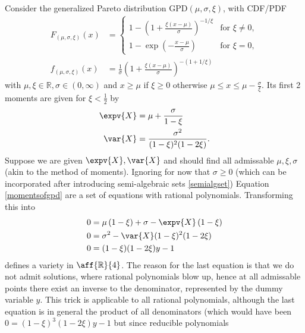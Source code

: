\begin{example}
    Consider the generalized Pareto distribution \( \text{GPD}(\mu, \sigma, \xi) \), with CDF/PDF
    \begin{align*}
        F_{(\mu,\sigma,\xi)}(x) &= \begin{cases}
1 - \left(1+ \frac{\xi(x-\mu)}{\sigma}\right)^{-1/\xi} & \text{for }\xi \neq 0, \\
1 - \exp \left(-\frac{x-\mu}{\sigma}\right) & \text{for }\xi = 0,
\end{cases} \\
            f_{(\mu,\sigma,\xi)}(x) &= \frac{1}{\sigma}\left(1 + \frac{\xi (x-\mu)}{\sigma}\right)^{- \left(1 + 1/\xi\right)}
    \end{align*}
    \[
    \]
    with \( \mu, \xi \in \mathbb{R}, \sigma \in (0, \infty) \) and \( x \geq \mu \) if \( \xi \geq 0 \) otherwise \( \mu \leq x \leq \mu - \frac{\sigma}{\xi} \). 
    Its first 2 moments are given for \( \xi < \frac{1}{2} \) by
    \begin{align} \label{momentsofgpd}
        \expv{X} &= \mu + \frac{\sigma}{1 - \xi} \\
        \var{X} &= \frac{\sigma^2}{(1 - \xi)^2 (1 - 2\xi)}.
    \end{align}
    \newline
    Suppose we are given \( \expv{X}, \var{X} \) and should find all admissable \( \mu, \xi, \sigma \) (akin to the method of moments). Ignoring for now
    that \( \sigma \geq 0 \) (which can be incorporated after introducing semi-algebraic sets \ref{semialgset}) Equation \ref{momentsofgpd}
    are a set of equations with rational polynomials. Transforming this into
    \begin{align*} 
        0  &= \mu\left(1 - \xi \right) + \sigma - \expv{X}\left(1 - \xi \right) \\
        0  &= \sigma^2 - \var{X}(1 - \xi)^2 (1 - 2\xi) \\
        0  &= (1 - \xi) (1 - 2\xi)y - 1
    \end{align*}
    defines a variety in \( \aff{\mathbb{R}}{4} \). The reason for the last equation is that we do not admit
    solutions, where rational polynomials blow up, hence at all admissable points there exist an inverse to the denominator, 
    represented by the dummy variable \( y \). This trick is applicable to all rational polynomials, although the last equation
    is in general the product of all denominators (which would have been \(0 = (1 - \xi)^3 (1 - 2\xi)y - 1 \) but since reducible polynomials

\end{example}
